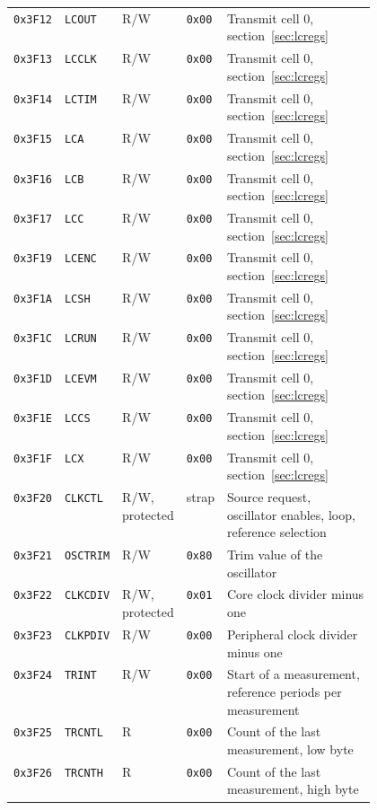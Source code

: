 \begin{longtable}{@{}llllp{0.47\linewidth}@{}}
\texttt{0x3F12} & \texttt{LCOUT} & R/W & \texttt{0x00} & Transmit cell 0, section~\ref{sec:lcregs} \\
\texttt{0x3F13} & \texttt{LCCLK} & R/W & \texttt{0x00} & Transmit cell 0, section~\ref{sec:lcregs} \\
\texttt{0x3F14} & \texttt{LCTIM} & R/W & \texttt{0x00} & Transmit cell 0, section~\ref{sec:lcregs} \\
\texttt{0x3F15} & \texttt{LCA} & R/W & \texttt{0x00} & Transmit cell 0, section~\ref{sec:lcregs} \\
\texttt{0x3F16} & \texttt{LCB} & R/W & \texttt{0x00} & Transmit cell 0, section~\ref{sec:lcregs} \\
\texttt{0x3F17} & \texttt{LCC} & R/W & \texttt{0x00} & Transmit cell 0, section~\ref{sec:lcregs} \\
\texttt{0x3F19} & \texttt{LCENC} & R/W & \texttt{0x00} & Transmit cell 0, section~\ref{sec:lcregs} \\
\texttt{0x3F1A} & \texttt{LCSH} & R/W & \texttt{0x00} & Transmit cell 0, section~\ref{sec:lcregs} \\
\texttt{0x3F1C} & \texttt{LCRUN} & R/W & \texttt{0x00} & Transmit cell 0, section~\ref{sec:lcregs} \\
\texttt{0x3F1D} & \texttt{LCEVM} & R/W & \texttt{0x00} & Transmit cell 0, section~\ref{sec:lcregs} \\
\texttt{0x3F1E} & \texttt{LCCS} & R/W & \texttt{0x00} & Transmit cell 0, section~\ref{sec:lcregs} \\
\texttt{0x3F1F} & \texttt{LCX} & R/W & \texttt{0x00} & Transmit cell 0, section~\ref{sec:lcregs} \\
\midrule
\texttt{0x3F20} & \texttt{CLKCTL} & R/W, protected & strap & Source request, oscillator enables, loop, reference selection \\
\texttt{0x3F21} & \texttt{OSCTRIM} & R/W & \texttt{0x80} & Trim value of the oscillator \\
\texttt{0x3F22} & \texttt{CLKCDIV} & R/W, protected & \texttt{0x01} & Core clock divider minus one \\
\texttt{0x3F23} & \texttt{CLKPDIV} & R/W & \texttt{0x00} & Peripheral clock divider minus one \\
\texttt{0x3F24} & \texttt{TRINT} & R/W & \texttt{0x00} & Start of a measurement, reference periods per measurement \\
\texttt{0x3F25} & \texttt{TRCNTL} & R & \texttt{0x00} & Count of the last measurement, low byte \\
\texttt{0x3F26} & \texttt{TRCNTH} & R & \texttt{0x00} & Count of the last measurement, high byte \\

\end{longtable}
